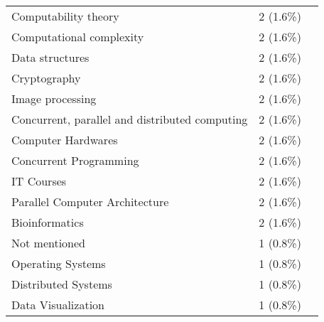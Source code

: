 \begin{table}[ht]
\begin{tabular}{l c p{4cm}}
		Computability theory & 2 (1.6\%) & \cite{dengel2023qualitative,kruger2024performance} \\
		Computational complexity & 2 (1.6\%) & \cite{dengel2023qualitative,kruger2024performance} \\
		Data structures & 2 (1.6\%) & \cite{dengel2023qualitative,kruger2024performance} \\
		Cryptography & 2 (1.6\%) & \cite{dengel2023qualitative,kruger2024performance} \\
		Image processing & 2 (1.6\%) & \cite{dengel2023qualitative,kruger2024performance} \\
		Concurrent, parallel and distributed computing & 2 (1.6\%) & \cite{dengel2023qualitative,kruger2024performance} \\
		Computer Hardwares & 2 (1.6\%) & \cite{dengel2023qualitative,zhang2024assistant} \\
		Concurrent Programming & 2 (1.6\%) & \cite{dengel2023qualitative,estevezayres2024evaluation} \\
		IT Courses & 2 (1.6\%) & \cite{dengel2023qualitative,gumina2023teaching} \\
		Parallel Computer Architecture & 2 (1.6\%) & \cite{dengel2023qualitative,gehringer2024dualsubmission} \\
		Bioinformatics & 2 (1.6\%) & \cite{dengel2023qualitative,piccolo2023evaluating} \\
		Not mentioned & 1 (0.8\%) & \cite{babe2023studenteval} \\
		Operating Systems & 1 (0.8\%) & \cite{agarwal2024which} \\
		Distributed Systems & 1 (0.8\%) & \cite{arora2024analyzing} \\
		Data Visualization & 1 (0.8\%) & \cite{kim2024chatgpt} \\
	\bottomrule
    \end{tabular}
    \label{tab:discipline}
\end{table}